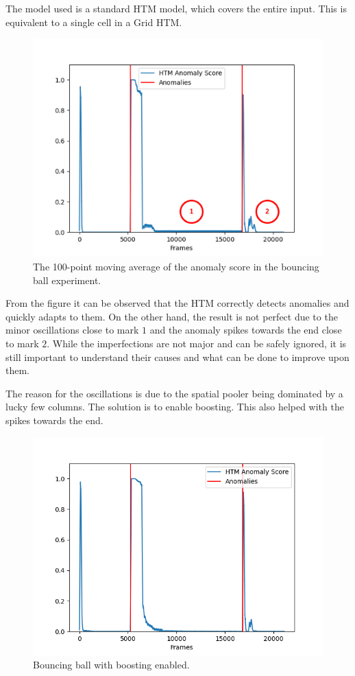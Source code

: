 \par
The model used is a standard HTM model, which covers the entire input. This is equivalent to a single cell in a Grid HTM.
\begin{figure}[H]
    \centering
    \includegraphics[width=\textwidth]{resources/experiments/bouncing_ball/bb_anoms_bad.png}
    \caption{The 100-point moving average of the anomaly score in the bouncing ball experiment.}
\end{figure}
From the figure it can be observed that the HTM correctly detects anomalies and quickly adapts to them. On the other hand, the result is not perfect due to the minor oscillations close to mark $1$ and the anomaly spikes towards the end close to mark $2$. While the imperfections are not major and can be safely ignored, it is still important to understand their causes and what can be done to improve upon them. \par
The reason for the oscillations is due to the spatial pooler being dominated by a lucky few columns. The solution is to enable boosting. This also helped with the spikes towards the end.\par
\begin{figure}[H]
    \centering
    \includegraphics[width=\textwidth]{resources/experiments/bouncing_ball/bb_anoms_boosting.png}
    \caption{Bouncing ball with boosting enabled.}
\end{figure}
